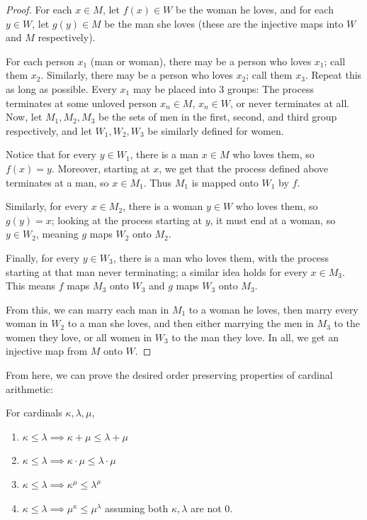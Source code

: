 \begin{proof}
    For each $x \in M$, let $f(x) \in W$ be the woman he loves, and for each $y \in W$, let $g(y) \in M$ be the man she loves (these are the injective maps into $W$ and $M$ respectively). 

    For each person $x_1$ (man or woman), there may be a person who loves $x_1$; call them $x_2$. Similarly, there may be a person who loves $x_2$; call them $x_3$. Repeat this as long as possible. Every $x_1$ may be placed into 3 groups: The process terminates at some unloved person $x_n \in M$, $x_n \in W$, or never terminates at all. Now, let $M_1, M_2, M_3$ be the sets of men in the first, second, and third group respectively, and let $W_1, W_2, W_3$ be similarly defined for women. 

    Notice that for every $y \in W_1$, there is a man $x \in M$ who loves them, so $f(x) = y$. Moreover, starting at $x$, we get that the process defined above terminates at a man, so $x \in M_1$. Thus $M_1$ is mapped onto $W_1$ by $f$.

    Similarly, for every $x \in M_2$, there is a woman $y \in W$ who loves them, so $g(y) = x$; looking at the process starting at $y$, it must end at a woman, so $y \in W_2$, meaning $g$ maps $W_2$ onto $M_2$. 

    Finally, for every $y \in W_3$, there is a man who loves them, with the process starting at that man never terminating; a similar idea holds for every $x \in M_3$. This means $f$ maps $M_3$ onto $W_3$ and $g$ maps $W_3$ onto $M_3$. 

    From this, we can marry each man in $M_1$ to a woman he loves, then marry every woman in $W_2$ to a man she loves, and then either marrying the men in $M_3$ to the women they love, or all women in $W_3$ to the man they love. In all, we get an injective map from $M$ onto $W$. 
\end{proof}

From here, we can prove the desired order preserving properties of cardinal arithmetic:

\begin{theorem}
    For cardinals $\kappa, \lambda, \mu$,

    \begin{enumerate}[label=(\alph*)]
        \item $\kappa \leq \lambda \implies \kappa + \mu \leq \lambda + \mu$
        \item $\kappa \leq \lambda \implies \kappa \cdot \mu \leq \lambda \cdot \mu$
        \item $\kappa \leq \lambda \implies \kappa^\mu \leq \lambda^\mu$
        \item $\kappa \leq \lambda \implies \mu^\kappa \leq \mu^\lambda$ assuming both $\kappa, \lambda$ are not 0.
    \end{enumerate}
\end{theorem}


